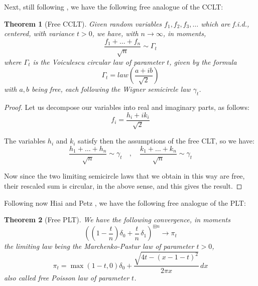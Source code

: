 \documentclass[12pt]{amsbook}
\newtheorem{theorem}{Theorem}[chapter]
\begin{document}
Next, still following \cite{vo1}, we have the following free analogue of the CCLT:


\begin{theorem}[Free CCLT]
Given random variables $f_1,f_2,f_3,\ldots$ which are f.i.d., centered, with variance $t>0$, we have, with $n\to\infty$, in moments,
$$\frac{f_1+\ldots+f_n}{\sqrt{n}}\sim\Gamma_t$$
where $\Gamma_t$ is the Voiculescu circular law of parameter $t$, given by the formula
$$\Gamma_t=law\left(\frac{a+ib}{\sqrt{2}}\right)$$
with $a,b$ being free, each following the Wigner semicircle law $\gamma_t$.
\end{theorem}

\begin{proof}
Let us decompose our variables into real and imaginary parts, as follows:
$$f_i=\frac{h_i+ik_i}{\sqrt{2}}$$

The variables $h_i$ and $k_i$ satisfy then the assumptions of the free CLT, so we have:
$$\frac{h_1+\ldots+h_n}{\sqrt{n}}\sim\gamma_t\quad,\quad 
\frac{k_1+\ldots+k_n}{\sqrt{n}}\sim\gamma_t$$

Now since the two limiting semicircle laws that we obtain in this way are free, their rescaled sum is circular, in the above sense, and this gives the result.
\end{proof}

Following now Hiai and Petz \cite{hpe}, we have the following free analogue of the PLT:


\begin{theorem}[Free PLT]
We have the following convergence, in moments
$$\left(\left(1-\frac{t}{n}\right)\delta_0+\frac{t}{n}\,\delta_1\right)^{\boxplus n}\to\pi_t$$
the limiting law being the Marchenko-Pastur law of parameter $t>0$, 
$$\pi_t=\max(1-t,0)\delta_0+\frac{\sqrt{4t-(x-1-t)^2}}{2\pi x}\,dx$$
also called free Poisson law of parameter $t$.
\end{theorem}
\end{document}
